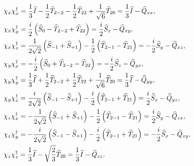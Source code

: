 \begin{align}
& \chi_{x} \chi_{x}^{\dagger}=\frac{1}{3} \widehat{I}-\frac{1}{2} \widehat{T}_{2-2}-\frac{1}{2} \widehat{T}_{22}+\frac{1}{\sqrt{6}} \widehat{T}_{20}=\frac{1}{3} \widehat{I}-\widehat{Q}_{x x}, \notag\\
& \chi_{x} \chi_{y}^{\dagger}=\frac{i}{2}\left(\widehat{S}_{0}-\widehat{T}_{2-2}+\widehat{T}_{22}\right)=\frac{i}{2} \widehat{S}_{z}-\widehat{Q}_{x y}, \notag\\
& \chi_{x} \chi_{z}^{\dagger}=\frac{1}{2 \sqrt{2}}\left(\widehat{S}_{-1}+\widehat{S}_{+1}\right)-\frac{1}{2}\left(\widehat{T}_{2-1}-\widehat{T}_{21}\right)=-\frac{i}{2} \widehat{S}_{y}-\widehat{Q}_{x z}, \notag\\
& \chi_{y} \chi_{x}^{\dagger}=-\frac{i}{2}\left(\widehat{S}_{0}+\widehat{T}_{2-2}-\widehat{T}_{22}\right)=-\frac{i}{2} \widehat{S}_{z}-\widehat{Q}_{y x}, \notag\\
& \chi_{y} \chi_{y}^{\dagger}=\frac{1}{3} \widehat{I}+\frac{1}{2} \widehat{T}_{2-2}+\frac{1}{2} \widehat{T}_{22}+\frac{1}{\sqrt{6}} \widehat{T}_{20}=\frac{1}{3} \widehat{I}-\widehat{Q}_{y y}, \label{eq:6:3:23}\\
& \chi_{y} \chi_{z}^{\dagger}=\frac{i}{2 \sqrt{2}}\left(\widehat{S}_{-1}-\widehat{S}_{+1}\right)-\frac{i}{2}\left(\widehat{T}_{2-1}+\widehat{T}_{21}\right)=\frac{i}{2} \widehat{S}_{x}-\widehat{Q}_{y z}, \notag\\
& \chi_{z} \chi_{x}^{\dagger}=-\frac{1}{2 \sqrt{2}}\left(\widehat{S}_{-1}+\widehat{S}_{+1}\right)-\frac{1}{2}\left(\widehat{T}_{2-1}-\widehat{T}_{21}\right)=\frac{i}{2} \widehat{S}_{y}-\widehat{Q}_{z x}, \notag\\
& \chi_{z} \chi_{y}^{\dagger}=-\frac{i}{2 \sqrt{2}}\left(\widehat{S}_{-1}-\widehat{S}_{+1}\right)-\frac{i}{2}\left(\widehat{T}_{2-1}+\widehat{T}_{21}\right)=-\frac{i}{2} \widehat{S}_{x}-\widehat{Q}_{z y}, \notag\\
& \chi_{z} \chi_{z}^{\dagger}=\frac{1}{3} \widehat{I}-\sqrt{\frac{2}{3}} \widehat{T}_{20}=\frac{1}{3} \widehat{I}-\widehat{Q}_{z z} . \notag
\end{align}
